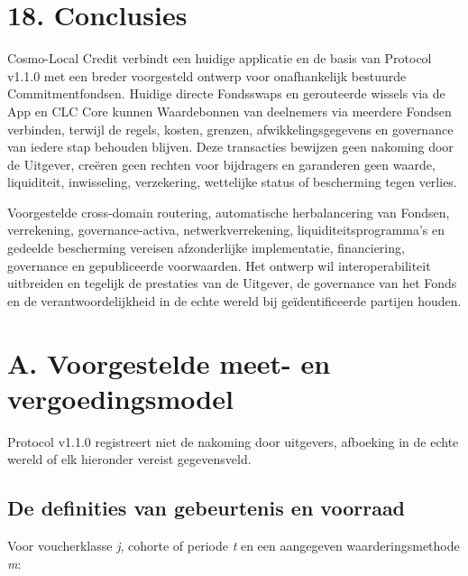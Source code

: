 \documentclass[11pt]{article}
\begin{document}
\section*{18. Conclusies}

Cosmo-Local Credit verbindt een huidige applicatie en de basis van Protocol v1.1.0 met een breder voorgesteld ontwerp voor onafhankelijk bestuurde Commitmentfondsen. Huidige directe Fondsswaps en gerouteerde wissels via de App en CLC Core kunnen Waardebonnen van deelnemers via meerdere Fondsen verbinden, terwijl de regels, kosten, grenzen, afwikkelingsgegevens en governance van iedere stap behouden blijven. Deze transacties bewijzen geen nakoming door de Uitgever, creëren geen rechten voor bijdragers en garanderen geen waarde, liquiditeit, inwisseling, verzekering, wettelijke status of bescherming tegen verlies.

Voorgestelde cross-domain routering, automatische herbalancering van Fondsen, verrekening, governance-activa, netwerkverrekening, liquiditeitsprogramma's en gedeelde bescherming vereisen afzonderlijke implementatie, financiering, governance en gepubliceerde voorwaarden. Het ontwerp wil interoperabiliteit uitbreiden en tegelijk de prestaties van de Uitgever, de governance van het Fonds en de verantwoordelijkheid in de echte wereld bij geïdentificeerde partijen houden.


\section*{A. Voorgestelde meet- en vergoedingsmodel}

Protocol v1.1.0 registreert niet de nakoming door uitgevers, afboeking in de echte wereld of elk hieronder vereist gegevensveld.

\subsection*{De definities van gebeurtenis en voorraad}

Voor voucherklasse \emph{j}, cohorte of periode \emph{t} en een aangegeven waarderingsmethode \emph{m}:
\end{document}
